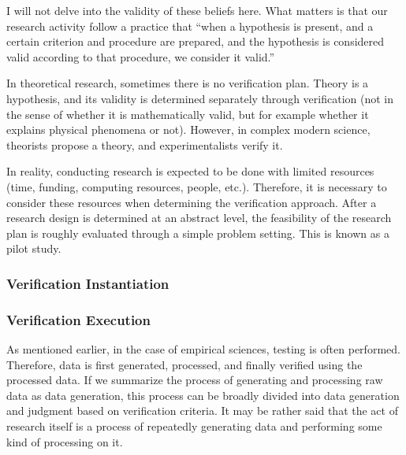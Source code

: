 \documentclass{book}
\begin{document}
I will not delve into the validity of these beliefs here. What matters is that our research activity follow a practice that ``when a hypothesis is present, and a certain criterion and procedure are prepared, and the hypothesis is considered valid according to that procedure, we consider it valid.''

In theoretical research, sometimes there is no verification plan. Theory is a hypothesis, and its validity is determined separately through verification (not in the sense of whether it is mathematically valid, but for example whether it explains physical phenomena or not). However, in complex modern science, theorists propose a theory, and experimentalists verify it.


In reality, conducting research is expected to be done with limited resources (time, funding, computing resources, people, etc.). Therefore, it is necessary to consider these resources when determining the verification approach. After a research design is determined at an abstract level, the feasibility of the research plan is roughly evaluated through a simple problem setting. This is known as a pilot study.

\subsubsection{Verification Instantiation}

\subsubsection{Verification Execution}

As mentioned earlier, in the case of empirical sciences, testing is often performed. Therefore, data is first generated, processed, and finally verified using the processed data. If we summarize the process of generating and processing raw data as data generation, this process can be broadly divided into data generation and judgment based on verification criteria. It may be rather said that the act of research itself is a process of repeatedly generating data and performing some kind of processing on it.
\end{document}

